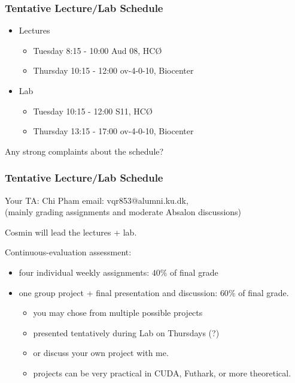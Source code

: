 \documentclass{beamer}
\begin{document}
\begin{frame}[fragile]
\frametitle{Tentative Lecture/Lab Schedule}
    \begin{itemize}
        \item Lectures\medskip
            \begin{itemize}
                \item Tuesday   8:15 - 10:00  Aud 08, HCØ\medskip
                \item Thursday 10:15 - 12:00  ov-4-0-10, Biocenter
            \end{itemize} \bigskip
        \item Lab\medskip
            \begin{itemize}
                \item Tuesday   10:15 - 12:00 S11, HCØ\medskip
                \item Thursday  13:15 - 17:00 ov-4-0-10, Biocenter
            \end{itemize}
    \end{itemize}
\bigskip

Any strong complaints about the schedule?
\end{frame}

\begin{frame}[fragile]
\frametitle{Tentative Lecture/Lab Schedule}

Your TA: Chi Pham 	email: vqr853@alumni.ku.dk,\\
(mainly grading assignments and moderate Absalon discussions)\bigskip

Cosmin will lead the lectures + lab.\bigskip

Continuous-evaluation assessment:
\begin{itemize}
    \item four individual weekly assignments: $40\%$ of final grade\medskip
    \item one group project + final presentation and discussion: $60\%$ of final grade.
        \begin{itemize}
            \item you may chose from multiple possible projects
            \item presented tentatively during Lab on Thursdays (?)
            \item or discuss your own project with me.
            \item projects can be very practical in CUDA, Futhark, or more theoretical.
        \end{itemize}
\end{itemize} 
\end{frame}
\end{document}
